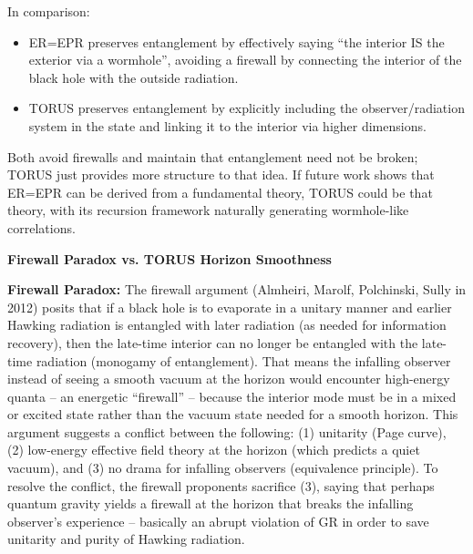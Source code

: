 \documentclass[]{article}
\begin{document}
In comparison:

\begin{itemize}
\item
  ER=EPR preserves entanglement by effectively saying ``the interior IS
  the exterior via a wormhole'', avoiding a firewall by connecting the
  interior of the black hole with the outside radiation.
\item
  TORUS preserves entanglement by explicitly including the
  observer/radiation system in the state and linking it to the interior
  via higher dimensions.
\end{itemize}

Both avoid firewalls and maintain that entanglement need not be broken;
TORUS just provides more structure to that idea. If future work shows
that ER=EPR can be derived from a fundamental theory, TORUS could be
that theory, with its recursion framework naturally generating
wormhole-like correlations.

\textbf{Firewall Paradox vs. TORUS Horizon Smoothness}

\textbf{Firewall Paradox:} The firewall argument (Almheiri, Marolf,
Polchinski, Sully in 2012) posits that if a black hole is to evaporate
in a unitary manner and earlier Hawking radiation is entangled with
later radiation (as needed for information recovery), then the late-time
interior can no longer be entangled with the late-time radiation
(monogamy of entanglement). That means the infalling observer instead of
seeing a smooth vacuum at the horizon would encounter high-energy quanta
-- an energetic ``firewall'' -- because the interior mode must be in a
mixed or excited state rather than the vacuum state needed for a smooth
horizon. This argument suggests a conflict between the following: (1)
unitarity (Page curve), (2) low-energy effective field theory at the
horizon (which predicts a quiet vacuum), and (3) no drama for infalling
observers (equivalence principle). To resolve the conflict, the firewall
proponents sacrifice (3), saying that perhaps quantum gravity yields a
firewall at the horizon that breaks the infalling observer's experience
-- basically an abrupt violation of GR in order to save unitarity and
purity of Hawking radiation.
\end{document}
